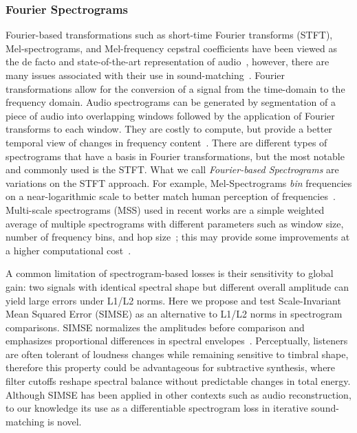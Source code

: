 \subsubsection{Fourier Spectrograms}
\label{sec:fourier_specs}
Fourier-based transformations such as short-time Fourier transforms (\gls{STFT}), Mel-spectrograms, and Mel-frequency cepstral coefficients have been viewed as the de facto and state-of-the-art representation of audio~\cite{beauchamp2003error,mitchell2007evolutionary,yee2018automatic}, however, there are many issues associated with their use in sound-matching~\cite{turian2020sorry,vahidi2023mesostructures,han2023perceptual,uzrad2024diffmoog}. Fourier transformations allow for the conversion of a signal from the time-domain to the frequency domain. Audio spectrograms can be generated by segmentation of a piece of audio into overlapping windows followed by the application of Fourier transforms to each window. They are costly to compute, but provide a better temporal view of changes in frequency content~\cite{muller2007dynamic,smith2007mathematics}. There are different types of spectrograms that have a basis in Fourier transformations, but the most notable and commonly used is the STFT.  
What we call \textit{Fourier-based Spectrograms} are variations on the STFT approach. For example, Mel-Spectrograms \textit{bin} frequencies on a near-logarithmic scale to better match human perception of frequencies~\cite{muller2007dynamic}. Multi-scale spectrograms (\gls{MSS}) used in recent works are a simple weighted average of multiple spectrograms with different parameters such as window size, number of frequency bins, and hop size~\cite{engel2020ddsp,vahidi2023mesostructures}; this may provide some improvements at a higher computational cost~\cite{turian2020sorry,engel2020ddsp}.

A common limitation of spectrogram-based losses is their sensitivity to global gain: two signals with identical spectral shape but different overall amplitude can yield large errors under L1/L2 norms. 
Here we propose and test Scale-Invariant Mean Squared Error (SIMSE) as an alternative to L1/L2 norms in spectrogram comparisons. SIMSE normalizes the amplitudes before comparison and emphasizes proportional differences in spectral envelopes~\cite{barron2014shapessimse}. 
Perceptually, listeners are often tolerant of loudness changes while remaining sensitive to timbral shape, therefore this property could be advantageous for subtractive synthesis, where filter cutoffs reshape spectral balance without predictable changes in total energy. Although SIMSE has been applied in other contexts such as audio reconstruction, to our knowledge its use as a differentiable spectrogram loss in iterative sound-matching is novel.

